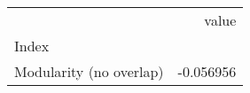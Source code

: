 \begin{tabular}{lr}
\toprule
{} &     value \\
Index                   &           \\
\midrule
Modularity (no overlap) & -0.056956 \\
\bottomrule
\end{tabular}
